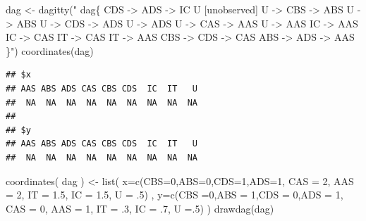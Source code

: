 \documentclass[
  10pt,
  dvipsnames,enabledeprecatedfontcommands]{scrartcl}
\newenvironment{Shaded}{\begin{snugshade}}{\end{snugshade}}
\newcommand{\AttributeTok}[1]{\textcolor[rgb]{0.77,0.63,0.00}{#1}}
\newcommand{\DecValTok}[1]{\textcolor[rgb]{0.00,0.00,0.81}{#1}}
\newcommand{\FloatTok}[1]{\textcolor[rgb]{0.00,0.00,0.81}{#1}}
\newcommand{\FunctionTok}[1]{\textcolor[rgb]{0.00,0.00,0.00}{#1}}
\newcommand{\NormalTok}[1]{#1}
\newcommand{\OtherTok}[1]{\textcolor[rgb]{0.56,0.35,0.01}{#1}}
\newcommand{\StringTok}[1]{\textcolor[rgb]{0.31,0.60,0.02}{#1}}
\begin{document}
\begin{Shaded}
\begin{Highlighting}[]
\NormalTok{dag }\OtherTok{\textless{}{-}} \FunctionTok{dagitty}\NormalTok{(}\StringTok{"}
\StringTok{  dag\{}
\StringTok{  CDS {-}\textgreater{} ADS {-}\textgreater{} IC  }
\StringTok{               U [unobserved]   }
\StringTok{               U {-}\textgreater{} CBS {-}\textgreater{} ABS  }
\StringTok{               U {-}\textgreater{} ABS        }
\StringTok{               U {-}\textgreater{} CDS {-}\textgreater{} ADS  }
\StringTok{               U {-}\textgreater{} ADS         }
\StringTok{               U {-}\textgreater{} CAS {-}\textgreater{} AAS    }
\StringTok{               U {-}\textgreater{} AAS                        }
\StringTok{               IC {-}\textgreater{} AAS        }
\StringTok{               IC {-}\textgreater{} CAS        }
\StringTok{               IT {-}\textgreater{} CAS        }
\StringTok{               IT {-}\textgreater{} AAS}
\StringTok{               CBS {-}\textgreater{} CDS {-}\textgreater{} CAS}
\StringTok{               ABS {-}\textgreater{} ADS {-}\textgreater{} AAS}
\StringTok{               \}"}\NormalTok{)}
\FunctionTok{coordinates}\NormalTok{(dag)}
\end{Highlighting}
\end{Shaded}

\begin{verbatim}
## $x
## AAS ABS ADS CAS CBS CDS  IC  IT   U 
##  NA  NA  NA  NA  NA  NA  NA  NA  NA 
## 
## $y
## AAS ABS ADS CAS CBS CDS  IC  IT   U 
##  NA  NA  NA  NA  NA  NA  NA  NA  NA
\end{verbatim}

\begin{Shaded}
\begin{Highlighting}[]
\FunctionTok{coordinates}\NormalTok{( dag ) }\OtherTok{\textless{}{-}} \FunctionTok{list}\NormalTok{( }\AttributeTok{x=}\FunctionTok{c}\NormalTok{(}\AttributeTok{CBS=}\DecValTok{0}\NormalTok{,}\AttributeTok{ABS=}\DecValTok{0}\NormalTok{,}\AttributeTok{CDS=}\DecValTok{1}\NormalTok{,}\AttributeTok{ADS=}\DecValTok{1}\NormalTok{, }\AttributeTok{CAS =} \DecValTok{2}\NormalTok{,}
                    \AttributeTok{AAS =} \DecValTok{2}\NormalTok{, }\AttributeTok{IT =} \FloatTok{1.5}\NormalTok{, }\AttributeTok{IC =} \FloatTok{1.5}\NormalTok{, }\AttributeTok{U =}\NormalTok{ .}\DecValTok{5}\NormalTok{) ,}
\AttributeTok{y=}\FunctionTok{c}\NormalTok{(}\AttributeTok{CBS =}\DecValTok{0}\NormalTok{,}\AttributeTok{ABS =} \DecValTok{1}\NormalTok{,}\AttributeTok{CDS =} \DecValTok{0}\NormalTok{,}\AttributeTok{ADS =} \DecValTok{1}\NormalTok{, }\AttributeTok{CAS =} \DecValTok{0}\NormalTok{, }\AttributeTok{AAS =} \DecValTok{1}\NormalTok{, }
    \AttributeTok{IT =}\NormalTok{ .}\DecValTok{3}\NormalTok{, }\AttributeTok{IC =}\NormalTok{ .}\DecValTok{7}\NormalTok{, }\AttributeTok{U =}\NormalTok{.}\DecValTok{5}\NormalTok{) )}
\FunctionTok{drawdag}\NormalTok{(dag)}
\end{Highlighting}
\end{Shaded}
\end{document}
